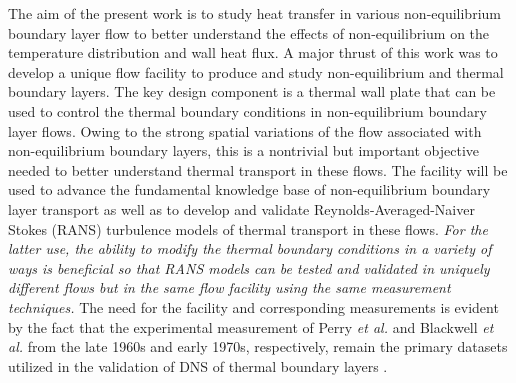 The aim of the present work is to study heat transfer in various non-equilibrium boundary layer flow to better understand the effects of non-equilibrium on the temperature distribution and wall heat flux. A major thrust of this work was to develop a unique flow facility to produce and study non-equilibrium and thermal boundary layers. The key design component is a thermal wall plate that can be used to control the thermal boundary conditions in non-equilibrium boundary layer flows. Owing to the strong spatial variations of the flow associated with non-equilibrium boundary layers, this is a nontrivial but important objective needed to better understand thermal transport in these flows. The facility will be used to advance the fundamental knowledge base of non-equilibrium boundary layer transport as well as to develop and validate Reynolds-Averaged-Naiver Stokes (RANS) turbulence models of thermal transport in these flows. \emph{For the latter use, the ability to modify the thermal boundary conditions in a variety of ways is beneficial so that RANS models can be tested and validated in uniquely different flows but in the same flow facility using the same measurement techniques.}  The need for the facility and corresponding measurements is evident by the fact that the experimental measurement of Perry \textit{et al.}\cite{Perry1966} and Blackwell \textit{et al.}\cite{Blackwell_1972} from the late 1960s and early 1970s, respectively, remain the primary datasets utilized in the validation of DNS of thermal boundary layers \cite{Araya2012}. 
